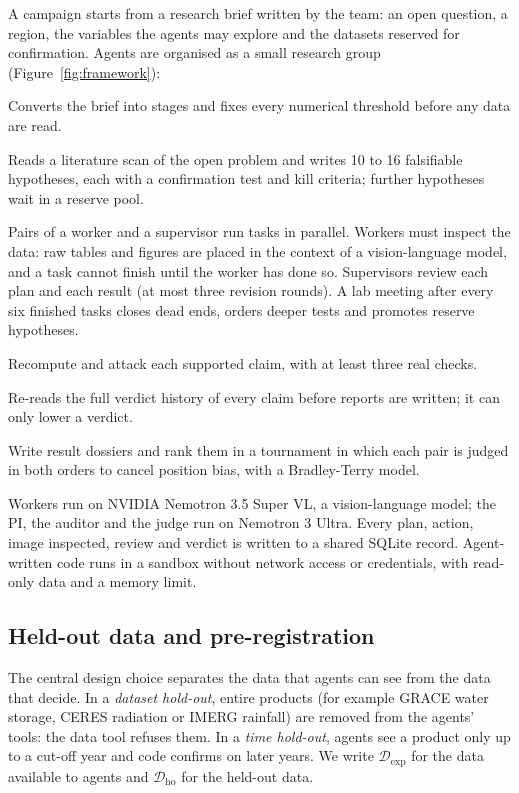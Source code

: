 \documentclass[11pt,a4paper]{article}
\newcommand{\Dexp}{\mathcal{D}_{\mathrm{exp}}}
\newcommand{\Dho}{\mathcal{D}_{\mathrm{ho}}}
\begin{document}
A campaign starts from a research brief written by the team: an open question, a region, the variables the agents
may explore and the datasets reserved for confirmation. Agents are organised as a small research group
(Figure~\ref{fig:framework}):

\begin{description}[leftmargin=1em,style=unboxed,font=\normalfont\bfseries]
  \item[Planner.] Converts the brief into stages and fixes every numerical threshold before any data are read.
  \item[Principal investigator (PI).] Reads a literature scan of the open problem and writes 10 to 16 falsifiable
        hypotheses, each with a confirmation test and kill criteria; further hypotheses wait in a reserve pool.
  \item[Lab.] Pairs of a worker and a supervisor run tasks in parallel. Workers must inspect the data: raw tables and
        figures are placed in the context of a vision-language model, and a task cannot finish until the worker has
        done so. Supervisors review each plan and each result (at most three revision rounds). A lab meeting after
        every six finished tasks closes dead ends, orders deeper tests and promotes reserve hypotheses.
  \item[Referees.] Recompute and attack each supported claim, with at least three real checks.
  \item[Auditor.] Re-reads the full verdict history of every claim before reports are written; it can only lower a
        verdict.
  \item[Editor and judge.] Write result dossiers and rank them in a tournament in which each pair is judged in both
        orders to cancel position bias, with a Bradley-Terry model.
\end{description}

Workers run on NVIDIA Nemotron 3.5 Super VL, a vision-language model; the PI, the auditor and the judge run on Nemotron
3 Ultra. Every plan, action, image inspected, review and verdict is written to a shared SQLite record. Agent-written
code runs in a sandbox without network access or credentials, with read-only data and a memory limit.

\subsection{Held-out data and pre-registration}

The central design choice separates the data that agents can see from the data that decide. In a \emph{dataset
hold-out}, entire products (for example GRACE water storage, CERES radiation or IMERG rainfall) are removed from the
agents' tools: the data tool refuses them. In a \emph{time hold-out}, agents see a product only up to a cut-off year
and code confirms on later years. We write $\Dexp$ for the data available to agents and $\Dho$ for the held-out data.
\end{document}
